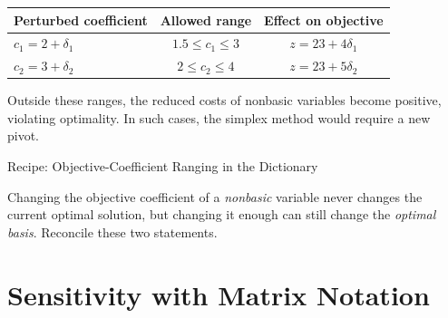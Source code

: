 \begin{center}
\renewcommand{\arraystretch}{1.3}
\begin{tabular}{@{}lcc@{}}
\toprule
Perturbed coefficient & Allowed range & Effect on objective \\
\midrule
\( c_1 = 2 + \delta_1 \) & \( 1.5 \leq c_1 \leq 3 \) & \( z = 23 + 4\delta_1 \) \\
\( c_2 = 3 + \delta_2 \) & \( 2 \leq c_2 \leq 4 \)   & \( z = 23 + 5\delta_2 \) \\
\bottomrule
\end{tabular}
\par{}\label{tab:sensitivity-LP-tab02}%

\end{center}

Outside these ranges, the reduced costs of nonbasic variables become positive, violating optimality. In such cases, the simplex method would require a new pivot.

\begin{algocard}{Recipe: Objective-Coefficient Ranging in the Dictionary}
\end{algocard}

\begin{learningcheckpoint}[label={lc:nonbasic-cost}]
Changing the objective coefficient of a \emph{nonbasic} variable never changes the current optimal solution, but changing it enough can still change the \emph{optimal basis}. Reconcile these two statements.
\end{learningcheckpoint}

\section{Sensitivity with Matrix Notation}
\label{sec:sensitivity-matrix}

